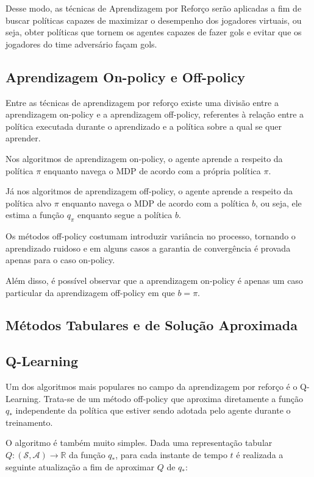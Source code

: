 Desse modo, as técnicas de Aprendizagem por Reforço serão aplicadas a fim de buscar políticas capazes de maximizar o desempenho dos jogadores virtuais, ou seja, obter políticas que tornem os agentes capazes de fazer gols e evitar que os jogadores do time adversário façam gols.

\subsection{Aprendizagem On-policy e Off-policy}

Entre as técnicas de aprendizagem por reforço existe uma divisão entre a aprendizagem on-policy e a aprendizagem off-policy, referentes à relação entre a política executada durante o aprendizado e a política sobre a qual se quer aprender.

Nos algoritmos de aprendizagem on-policy, o agente aprende a respeito da política $\pi$ enquanto navega o MDP de acordo com a própria política $\pi$.

Já nos algoritmos de aprendizagem off-policy, o agente aprende a respeito da política alvo $\pi$ enquanto navega o MDP de acordo com a política $b$, ou seja, ele estima a função $q_{\pi}$ enquanto segue a política $b$.

Os métodos off-policy costumam introduzir variância no processo, tornando o aprendizado ruidoso e em alguns casos a garantia de convergência é provada apenas para o caso on-policy. %

Além disso, é possível observar que a aprendizagem on-policy é apenas um caso particular da aprendizagem off-policy em que $b = \pi$.

\subsection{Métodos Tabulares e de Solução Aproximada}


\subsection{Q-Learning}

Um dos algoritmos mais populares no campo da aprendizagem por reforço é o Q-Learning. Trata-se de um método off-policy que aproxima diretamente a função $q_*$ independente da política que estiver sendo adotada pelo agente durante o treinamento.

O algoritmo é também muito simples. Dada uma representação tabular $Q: (\mathcal{S},\mathcal{A}) \to \mathbb{R}$ da função $q_*$, para cada instante de tempo $t$ é realizada a seguinte atualização a fim de aproximar $Q$ de $q_*$:

